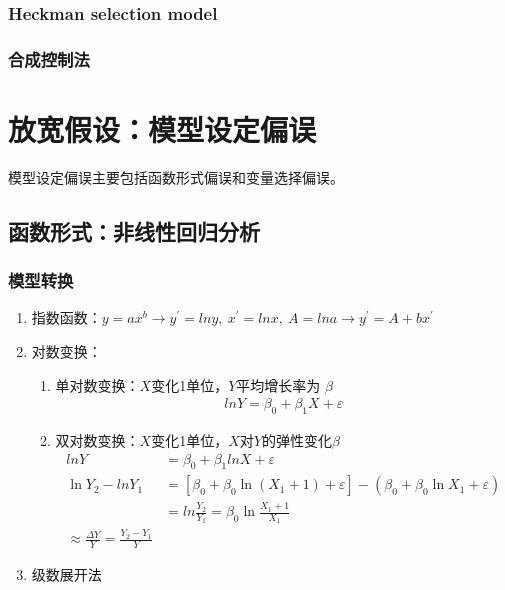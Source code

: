 \documentclass[12pt]{book}
\begin{document}
\subsubsection{Heckman selection model}




\subsubsection{合成控制法}







\section{放宽假设：模型设定偏误}













模型设定偏误主要包括函数形式偏误和变量选择偏误。

\subsection{函数形式：非线性回归分析}


\subsubsection{模型转换}


\begin{enumerate}[1.]
    \item 指数函数：$y=a{x}^b\rightarrow y^\prime=lny,\ x^\prime=lnx,\ A=lna\rightarrow y^\prime=A+bx^\prime$
    \item 对数变换：
          \begin{enumerate}[(1)]
              \item 单对数变换：$X$变化1单位，$Y$平均增长率为 $\beta$
                    \begin{gather*}
                        lnY=\beta_0+\beta_1X+\varepsilon
                    \end{gather*}
              \item 双对数变换：$X$变化1单位，$X$对$Y$的弹性变化$\beta$
                    \begin{align*}
                        lnY&=\beta_0+\beta_1lnX+\varepsilon\\
                        \ln{Y_2}-lnY_1
                        &=\left[\beta_0+\beta_0\ln{\left(X_1+1\right)}+\varepsilon\right]-\left(\beta_0+\beta_0\ln{X_1}+\varepsilon\right)\\
                        &=ln\frac{Y_2}{Y_1} =\beta_0\ln{\frac{X_1+1}{X_1}}\\
                        \approx\frac{\Delta Y}{Y} =\frac{Y_2-Y_1}{Y}
                    \end{align*}
          \end{enumerate}
    \item 级数展开法
\end{enumerate}
\end{document}
